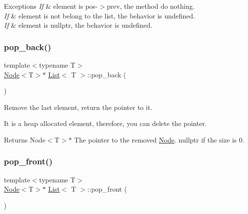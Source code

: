 \begin{DoxyExceptions}{Exceptions}
{\em If} & element is pos-\/$>$prev, the method do nothing. \\
\hline
{\em If} & element is not belong to the list, the behavior is undefined. \\
\hline
{\em If} & element is nullptr, the behavior is undefined. \\
\hline
\end{DoxyExceptions}
\mbox{\label{classList_aca64c15e326dd7515499310bc9f2efb0}} 
\subsubsection{\texorpdfstring{pop\+\_\+back()}{pop\_back()}}
{\footnotesize\ttfamily template$<$typename T$>$ \\
\hyperlink{structNode}{Node}$<$T$>$$\ast$ \hyperlink{classList}{List}$<$ T $>$\+::pop\+\_\+back (\begin{DoxyParamCaption}{ }\end{DoxyParamCaption})\hspace{0.3cm}{\ttfamily [inline]}}



Remove the last element, return the pointer to it. 

It is a heap allocated element, therefore, you can delete the pointer.

\begin{DoxyReturn}{Returns}
Node$<$\+T$>$$\ast$ The pointer to the removed \hyperlink{structNode}{Node}. {\ttfamily nullptr} if the size is 0. 
\end{DoxyReturn}
\mbox{\label{classList_a3188f038a0b9c0a578bccdf7348f42b5}} 
\subsubsection{\texorpdfstring{pop\+\_\+front()}{pop\_front()}}
{\footnotesize\ttfamily template$<$typename T$>$ \\
\hyperlink{structNode}{Node}$<$T$>$$\ast$ \hyperlink{classList}{List}$<$ T $>$\+::pop\+\_\+front (\begin{DoxyParamCaption}{ }\end{DoxyParamCaption})\hspace{0.3cm}{\ttfamily [inline]}}



